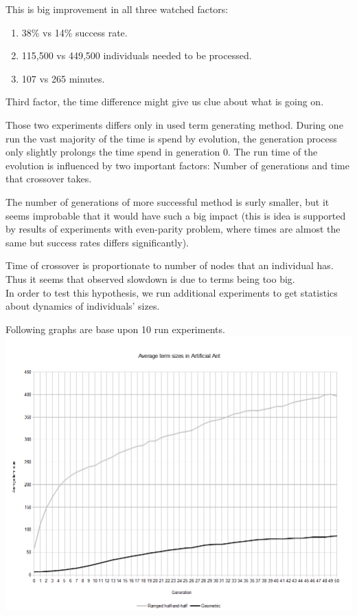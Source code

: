 \documentclass[12pt,a4paper]{report}
\begin{document}
\newpage


This is big improvement in all three watched factors:

\begin{enumerate}
 \item 38\% vs 14\% success rate.
 \item 115,500 vs 449,500 individuals needed to be processed.
 \item 107 vs 265 minutes.  
\end{enumerate}

Third factor, the time difference might give us clue about what is going on.

Those two experiments differs only in used term generating method.
During one run the vast majority of the time is spend by evolution,
the generation process only slightly prolongs the time spend in generation 0.
The run time of the evolution is influenced by two important factors:
Number of generations and time that crossover takes.

The number of generations of more successful method is surly smaller,
but it seems improbable that it would have such a big impact 
(this is idea is supported by results of experiments with
even-parity problem, where times are almost the same but success 
rates differs significantly). 

Time of crossover is proportionate to number of nodes that 
an individual has. Thus it seems that observed slowdown is
due to terms being too big. \\

In order to test this hypothesis, we run additional experiments
to get statistics about dynamics of individuals' sizes. 

Following graphs are base upon 10 run experiments.\\ 

\includegraphics[scale=0.45]{reports/Ant/ts.png}
\end{document}
